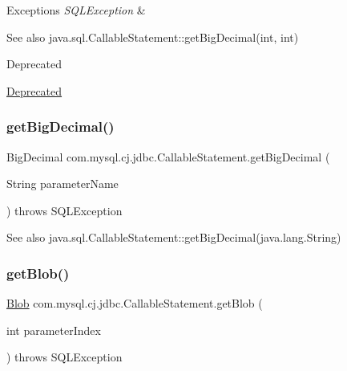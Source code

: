\begin{DoxyExceptions}{Exceptions}
{\em S\+Q\+L\+Exception} & \\
\hline
\end{DoxyExceptions}
\begin{DoxySeeAlso}{See also}
java.\+sql.\+Callable\+Statement\+::get\+Big\+Decimal(int, int) 
\end{DoxySeeAlso}
\begin{DoxyRefDesc}{Deprecated}
\item[\mbox{\hyperlink{deprecated__deprecated000003}{Deprecated}}]\end{DoxyRefDesc}
\mbox{\label{classcom_1_1mysql_1_1cj_1_1jdbc_1_1_callable_statement_adc05152dc0cfb8a4dfc6a9d4c6ea989e}} 
\subsubsection{\texorpdfstring{get\+Big\+Decimal()}{getBigDecimal()}\hspace{0.1cm}{\footnotesize\ttfamily [3/3]}}
{\footnotesize\ttfamily Big\+Decimal com.\+mysql.\+cj.\+jdbc.\+Callable\+Statement.\+get\+Big\+Decimal (\begin{DoxyParamCaption}\item[{String}]{parameter\+Name }\end{DoxyParamCaption}) throws S\+Q\+L\+Exception}

\begin{DoxySeeAlso}{See also}
java.\+sql.\+Callable\+Statement\+::get\+Big\+Decimal(java.\+lang.\+String) 
\end{DoxySeeAlso}
\mbox{\label{classcom_1_1mysql_1_1cj_1_1jdbc_1_1_callable_statement_a8e4c5f767bd7bd21b27fddd12f787f08}} 
\subsubsection{\texorpdfstring{get\+Blob()}{getBlob()}\hspace{0.1cm}{\footnotesize\ttfamily [1/2]}}
{\footnotesize\ttfamily \mbox{\hyperlink{classcom_1_1mysql_1_1cj_1_1jdbc_1_1_blob}{Blob}} com.\+mysql.\+cj.\+jdbc.\+Callable\+Statement.\+get\+Blob (\begin{DoxyParamCaption}\item[{int}]{parameter\+Index }\end{DoxyParamCaption}) throws S\+Q\+L\+Exception}

